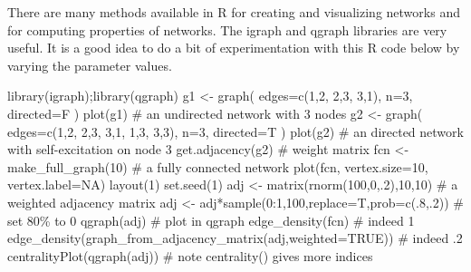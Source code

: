 \documentclass[
  letterpaper,
]{scrbook}
\newenvironment{Shaded}{\begin{snugshade}}{\end{snugshade}}
\newcommand{\AttributeTok}[1]{\textcolor[rgb]{0.40,0.45,0.13}{#1}}
\newcommand{\CommentTok}[1]{\textcolor[rgb]{0.37,0.37,0.37}{#1}}
\newcommand{\ConstantTok}[1]{\textcolor[rgb]{0.56,0.35,0.01}{#1}}
\newcommand{\DecValTok}[1]{\textcolor[rgb]{0.68,0.00,0.00}{#1}}
\newcommand{\FunctionTok}[1]{\textcolor[rgb]{0.28,0.35,0.67}{#1}}
\newcommand{\NormalTok}[1]{\textcolor[rgb]{0.00,0.23,0.31}{#1}}
\newcommand{\OtherTok}[1]{\textcolor[rgb]{0.00,0.23,0.31}{#1}}
\newcommand{\SpecialCharTok}[1]{\textcolor[rgb]{0.37,0.37,0.37}{#1}}
\begin{document}
There are many methods available in R for creating and visualizing
networks and for computing properties of networks. The igraph and qgraph
libraries are very useful. It is a good idea to do a bit of
experimentation with this R code below by varying the parameter values.

\begin{Shaded}
\begin{Highlighting}[]
\FunctionTok{library}\NormalTok{(igraph);}\FunctionTok{library}\NormalTok{(qgraph)}
\NormalTok{g1 }\OtherTok{\textless{}{-}} \FunctionTok{graph}\NormalTok{( }\AttributeTok{edges=}\FunctionTok{c}\NormalTok{(}\DecValTok{1}\NormalTok{,}\DecValTok{2}\NormalTok{, }\DecValTok{2}\NormalTok{,}\DecValTok{3}\NormalTok{, }\DecValTok{3}\NormalTok{,}\DecValTok{1}\NormalTok{), }\AttributeTok{n=}\DecValTok{3}\NormalTok{, }\AttributeTok{directed=}\NormalTok{F ) }
\FunctionTok{plot}\NormalTok{(g1) }\CommentTok{\# an undirected network with 3 nodes}
\NormalTok{g2 }\OtherTok{\textless{}{-}} \FunctionTok{graph}\NormalTok{( }\AttributeTok{edges=}\FunctionTok{c}\NormalTok{(}\DecValTok{1}\NormalTok{,}\DecValTok{2}\NormalTok{, }\DecValTok{2}\NormalTok{,}\DecValTok{3}\NormalTok{, }\DecValTok{3}\NormalTok{,}\DecValTok{1}\NormalTok{, }\DecValTok{1}\NormalTok{,}\DecValTok{3}\NormalTok{, }\DecValTok{3}\NormalTok{,}\DecValTok{3}\NormalTok{), }\AttributeTok{n=}\DecValTok{3}\NormalTok{, }\AttributeTok{directed=}\NormalTok{T ) }
\FunctionTok{plot}\NormalTok{(g2) }\CommentTok{\# an directed network with self{-}excitation on node 3}
\FunctionTok{get.adjacency}\NormalTok{(g2) }\CommentTok{\# weight matrix}
\NormalTok{fcn }\OtherTok{\textless{}{-}} \FunctionTok{make\_full\_graph}\NormalTok{(}\DecValTok{10}\NormalTok{) }\CommentTok{\# a fully connected network}
\FunctionTok{plot}\NormalTok{(fcn, }\AttributeTok{vertex.size=}\DecValTok{10}\NormalTok{, }\AttributeTok{vertex.label=}\ConstantTok{NA}\NormalTok{)}
\FunctionTok{layout}\NormalTok{(}\DecValTok{1}\NormalTok{)}
\FunctionTok{set.seed}\NormalTok{(}\DecValTok{1}\NormalTok{)}
\NormalTok{adj }\OtherTok{\textless{}{-}} \FunctionTok{matrix}\NormalTok{(}\FunctionTok{rnorm}\NormalTok{(}\DecValTok{100}\NormalTok{,}\DecValTok{0}\NormalTok{,.}\DecValTok{2}\NormalTok{),}\DecValTok{10}\NormalTok{,}\DecValTok{10}\NormalTok{) }\CommentTok{\# a weighted adjacency matrix}
\NormalTok{adj }\OtherTok{\textless{}{-}}\NormalTok{ adj}\SpecialCharTok{*}\FunctionTok{sample}\NormalTok{(}\DecValTok{0}\SpecialCharTok{:}\DecValTok{1}\NormalTok{,}\DecValTok{100}\NormalTok{,}\AttributeTok{replace=}\NormalTok{T,}\AttributeTok{prob=}\FunctionTok{c}\NormalTok{(.}\DecValTok{8}\NormalTok{,.}\DecValTok{2}\NormalTok{)) }\CommentTok{\# set 80\% to 0}
\FunctionTok{qgraph}\NormalTok{(adj) }\CommentTok{\# plot in qgraph}
\FunctionTok{edge\_density}\NormalTok{(fcn) }\CommentTok{\# indeed 1}
\FunctionTok{edge\_density}\NormalTok{(}\FunctionTok{graph\_from\_adjacency\_matrix}\NormalTok{(adj,}\AttributeTok{weighted=}\ConstantTok{TRUE}\NormalTok{)) }\CommentTok{\# indeed .2}
\FunctionTok{centralityPlot}\NormalTok{(}\FunctionTok{qgraph}\NormalTok{(adj)) }\CommentTok{\# note centrality() gives more indices}
\end{Highlighting}
\end{Shaded}
\end{document}
